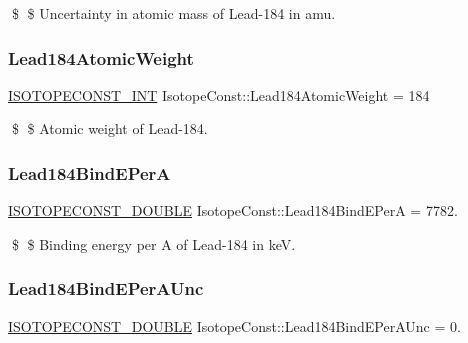 \$ \$ Uncertainty in atomic mass of Lead-\/184 in amu. \mbox{\label{group___isotope_const-_lead-_pb184_ga52554030a0b975e0b03766c5b6eabb70}} 
\subsubsection{\texorpdfstring{Lead184\+Atomic\+Weight}{Lead184AtomicWeight}}
{\footnotesize\ttfamily \mbox{\hyperlink{group___isotope_const-_macros_ga5f18360b3e99483a35c32d789e62621c}{I\+S\+O\+T\+O\+P\+E\+C\+O\+N\+S\+T\+\_\+\+I\+NT}} Isotope\+Const\+::\+Lead184\+Atomic\+Weight = 184}

\$ \$ Atomic weight of Lead-\/184. \mbox{\label{group___isotope_const-_lead-_pb184_ga66179e497deb2b573be74485cd331002}} 
\subsubsection{\texorpdfstring{Lead184\+Bind\+E\+PerA}{Lead184BindEPerA}}
{\footnotesize\ttfamily \mbox{\hyperlink{group___isotope_const-_macros_ga8f45a7272ce02c0b4c65c44636ed719a}{I\+S\+O\+T\+O\+P\+E\+C\+O\+N\+S\+T\+\_\+\+D\+O\+U\+B\+LE}} Isotope\+Const\+::\+Lead184\+Bind\+E\+PerA = 7782.}

\$ \$ Binding energy per A of Lead-\/184 in keV. \mbox{\label{group___isotope_const-_lead-_pb184_gae657bd2b496b1d406b875a25140a927b}} 
\subsubsection{\texorpdfstring{Lead184\+Bind\+E\+Per\+A\+Unc}{Lead184BindEPerAUnc}}
{\footnotesize\ttfamily \mbox{\hyperlink{group___isotope_const-_macros_ga8f45a7272ce02c0b4c65c44636ed719a}{I\+S\+O\+T\+O\+P\+E\+C\+O\+N\+S\+T\+\_\+\+D\+O\+U\+B\+LE}} Isotope\+Const\+::\+Lead184\+Bind\+E\+Per\+A\+Unc = 0.}

